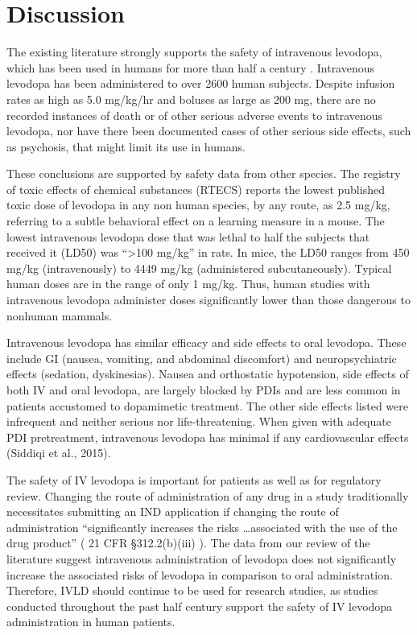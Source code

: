 \section{Discussion}
The existing literature strongly supports the safety of intravenous levodopa, which has been used in humans for more than half a century \cite{14430381}.  Intravenous levodopa has been administered to over 2600 human subjects.  Despite infusion rates as high as 5.0 mg/kg/hr and boluses as large as 200 mg, there are no recorded instances of death or of other serious adverse events to intravenous levodopa, nor have there been documented cases of other serious side effects, such as psychosis, that might limit its use in humans.  

These conclusions are supported by safety data from other species. The registry of toxic effects of chemical substances (RTECS) reports the lowest published toxic dose of levodopa in any non human species, by any route, as 2.5 mg/kg, referring to a subtle behavioral effect on a learning measure in a mouse.  The lowest intravenous levodopa dose that was lethal to half the subjects that received it (LD50) was ``>100 mg/kg'' in rats.  In mice, the LD50 ranges from 450 mg/kg (intravenously) to 4449 mg/kg (administered subcutaneously).  Typical human doses are in the range of only 1 mg/kg.  Thus, human studies with intravenous levodopa administer doses significantly lower than those dangerous to nonhuman mammals. 

Intravenous levodopa has similar efficacy and side effects to oral levodopa.  These include GI (nausea, vomiting, and abdominal discomfort) and neuropsychiatric effects (sedation, dyskinesias).  Nausea and orthostatic hypotension, side effects of both IV and oral levodopa, are largely blocked by PDIs and are less common in patients accustomed to dopamimetic treatment.  The other side effects listed were infrequent and neither serious nor life-threatening. When given with adequate PDI pretreatment, intravenous levodopa has minimal if any cardiovascular effects (Siddiqi et al., 2015).

The safety of IV levodopa is important for patients as well as for regulatory review.  Changing the route of administration of any drug in a study traditionally necessitates submitting an IND application if changing the route of administration “significantly increases the risks \dots associated with the use of the drug product” ( 21 CFR \S 312.2(b)(iii) ).  The data from our review of the literature suggest intravenous administration of levodopa does not significantly increase the associated risks of levodopa in comparison to oral administration.  Therefore, IVLD should continue to be used for research studies, as studies conducted throughout the past half century support the safety of IV levodopa administration in human patients.